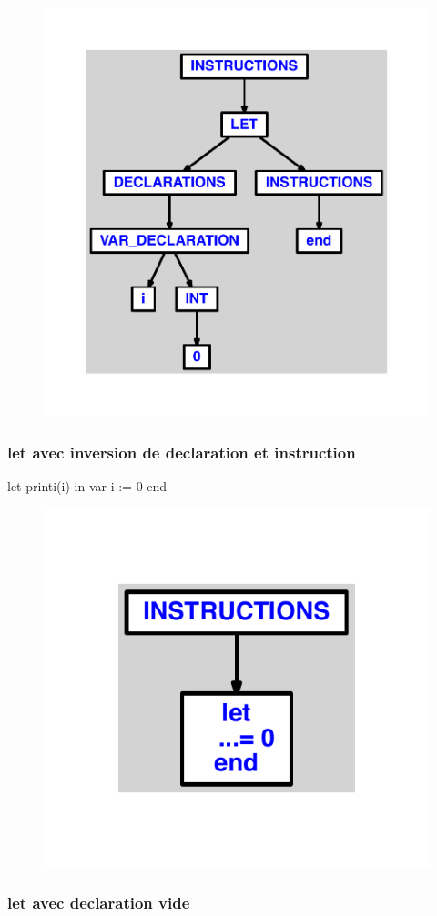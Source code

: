 \documentclass{article}
\begin{document}
\begin{figure}[H]\centering\includegraphics[max width=\textwidth]{ast/ast_259.pdf}\end{figure}\subsubsection{let avec inversion de declaration et instruction}
\begin{verbatimtab}
let
	printi(i)
in
	var i := 0
end
\end{verbatimtab}
\begin{figure}[H]\centering\includegraphics[max width=\textwidth]{ast/ast_260.pdf}\end{figure}\subsubsection{let avec declaration vide}
\end{document}
